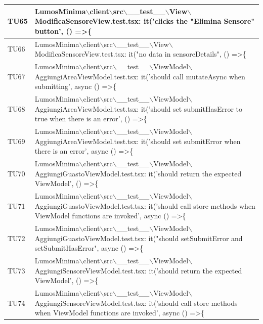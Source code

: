 \documentclass[12pt]{article}
\begin{document}
\begin{scriptsize}
\begin{xltabular}{\linewidth}{|>{\hsize}X|X|}
	TU65 & LumosMinima$\backslash$client$\backslash$src$\backslash$\_\_test\_\_$\backslash$View$\backslash$ModificaSensoreView.test.tsx: it('clicks the "Elimina Sensore" button', () =\textgreater \{ \\ \hline
	TU66 & LumosMinima$\backslash$client$\backslash$src$\backslash$\_\_test\_\_$\backslash$View$\backslash$ModificaSensoreView.test.tsx: it("no data in sensoreDetails", () =\textgreater \{ \\ \hline
	TU67 & LumosMinima$\backslash$client$\backslash$src$\backslash$\_\_test\_\_$\backslash$ViewModel$\backslash$AggiungiAreaViewModel.test.tsx: it('should call mutateAsync when submitting', async () =\textgreater \{ \\ \hline
	TU68 & LumosMinima$\backslash$client$\backslash$src$\backslash$\_\_test\_\_$\backslash$ViewModel$\backslash$AggiungiAreaViewModel.test.tsx: it('should set submitHasError to true when there is an error', () =\textgreater \{ \\ \hline
	TU69 & LumosMinima$\backslash$client$\backslash$src$\backslash$\_\_test\_\_$\backslash$ViewModel$\backslash$AggiungiAreaViewModel.test.tsx: it('should set submitError when there is an error', async () =\textgreater \{ \\ \hline
	TU70 & LumosMinima$\backslash$client$\backslash$src$\backslash$\_\_test\_\_$\backslash$ViewModel$\backslash$AggiungiGuastoViewModel.test.tsx: it('should return the expected ViewModel', () =\textgreater \{ \\ \hline
	TU71 & LumosMinima$\backslash$client$\backslash$src$\backslash$\_\_test\_\_$\backslash$ViewModel$\backslash$AggiungiGuastoViewModel.test.tsx: it('should call store methods when ViewModel functions are invoked', async () =\textgreater \{ \\ \hline
	TU72 & LumosMinima$\backslash$client$\backslash$src$\backslash$\_\_test\_\_$\backslash$ViewModel$\backslash$AggiungiGuastoViewModel.test.tsx: it("should setSubmitError and setSubmitHasError", async () =\textgreater \{ \\ \hline
	TU73 & LumosMinima$\backslash$client$\backslash$src$\backslash$\_\_test\_\_$\backslash$ViewModel$\backslash$AggiungiSensoreViewModel.test.tsx: it('should return the expected ViewModel', () =\textgreater \{ \\ \hline
	TU74 & LumosMinima$\backslash$client$\backslash$src$\backslash$\_\_test\_\_$\backslash$ViewModel$\backslash$AggiungiSensoreViewModel.test.tsx: it('should call store methods when ViewModel functions are invoked', async () =\textgreater \{ \\ \hline

\end{xltabular}
\end{scriptsize}
\end{document}
